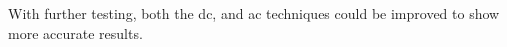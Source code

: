 \documentclass[a4paper,12pt]{report}
\begin{document}
{{    With further testing, both the \gls{dc}, and \gls{ac} techniques could be improved to show more accurate results.

    

\newpage
    \tableofcontents



\pagestyle{fancy}


\renewcommand{\acronymname}{Glossary}
\printnoidxglossaries





%



\appendix



}} %
\end{document}
